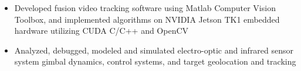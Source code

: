 \begin{itemize} [leftmargin = \itemmargin]
	\item Developed fusion video tracking software using Matlab Computer Vision Toolbox, and implemented algorithms on NVIDIA Jetson TK1 embedded hardware utilizing CUDA C/C++ and OpenCV
	\item Analyzed, debugged, modeled and simulated electro-optic and infrared sensor system gimbal dynamics, control systems, and target geolocation and tracking
	
\end{itemize} 